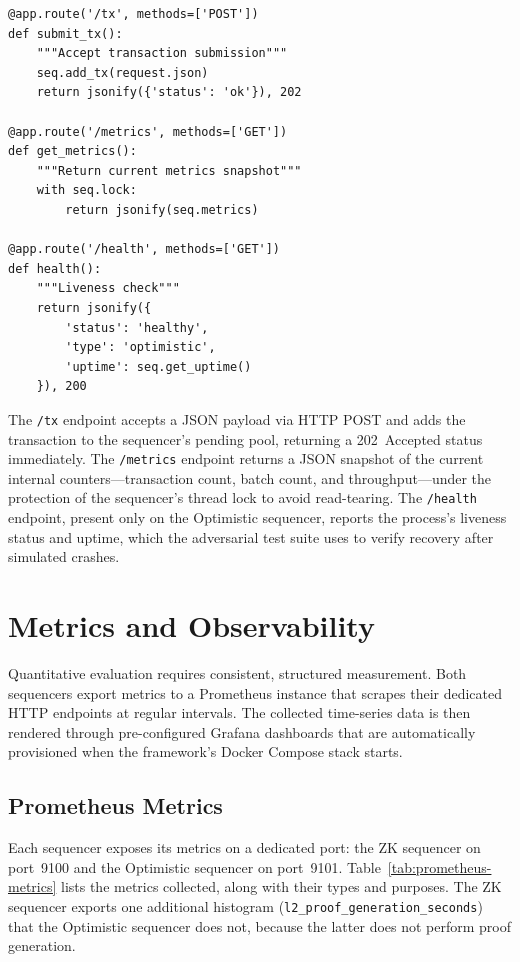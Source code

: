 \begin{listing}[H]
    \begin{verbatim}
@app.route('/tx', methods=['POST'])
def submit_tx():
    """Accept transaction submission"""
    seq.add_tx(request.json)
    return jsonify({'status': 'ok'}), 202

@app.route('/metrics', methods=['GET'])
def get_metrics():
    """Return current metrics snapshot"""
    with seq.lock:
        return jsonify(seq.metrics)

@app.route('/health', methods=['GET'])
def health():
    """Liveness check"""
    return jsonify({
        'status': 'healthy',
        'type': 'optimistic',
        'uptime': seq.get_uptime()
    }), 200
    \end{verbatim}
    \caption{Flask API endpoints}
    \label{lst:flask-api}
\end{listing}

The \texttt{/tx} endpoint accepts a JSON payload via HTTP POST and adds the transaction to the sequencer's pending pool, returning a 202~Accepted status immediately. The \texttt{/metrics} endpoint returns a JSON snapshot of the current internal counters---transaction count, batch count, and throughput---under the protection of the sequencer's thread lock to avoid read-tearing. The \texttt{/health} endpoint, present only on the Optimistic sequencer, reports the process's liveness status and uptime, which the adversarial test suite uses to verify recovery after simulated crashes.

\section{Metrics and Observability}

Quantitative evaluation requires consistent, structured measurement. Both sequencers export metrics to a Prometheus instance that scrapes their dedicated HTTP endpoints at regular intervals. The collected time-series data is then rendered through pre-configured Grafana dashboards that are automatically provisioned when the framework's Docker Compose stack starts.

\subsection{Prometheus Metrics}

Each sequencer exposes its metrics on a dedicated port: the ZK sequencer on port~9100 and the Optimistic sequencer on port~9101. Table~\ref{tab:prometheus-metrics} lists the metrics collected, along with their types and purposes. The ZK sequencer exports one additional histogram (\texttt{l2\_proof\_generation\_seconds}) that the Optimistic sequencer does not, because the latter does not perform proof generation.

